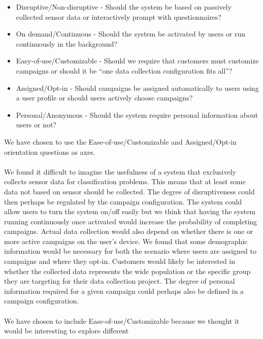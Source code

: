 \begin{itemize}[itemsep=0.1em]
	\item Disruptive/Non-disruptive - Should the system be based on passively collected sensor data or interactively prompt with questionnaires? %
	\item On demand/Continuous - Should the system be activated by users or run continuously in the background? %
	\item Easy-of-use/Customizable - Should we require that customers must customize campaigns or should it be ``one data collection configuration fits all''? %
	\item Assigned/Opt-in - Should campaigns be assigned automatically to users using a user profile or should users actively choose campaigns? %
	\item Personal/Anonymous - Should the system require personal information about users or not? %
\end{itemize}

We have chosen to use the Ease-of-use/Customizable and Assigned/Opt-in orientation questions as axes. 
\\\\
We found it difficult to imagine the usefulness of a system that exclusively collects sensor data for classification problems. This means that at least some data not based on sensor should be collected. The degree of disruptiveness could then perhaps be regulated by the campaign configuration. 
The system could allow users to turn the system on/off easily but we think that having the system running continuously once activated would increase the probability of completing campaigns. Actual data collection would also depend on whether there is one or more active campaigns on the user's device.
We found that some demographic information would be necessary for both the scenario where users are assigned to campaigns and where they opt-in. Customers would likely be interested in whether the collected data represents the wide population or the specific group they are targeting for their data collection project. The degree of personal information required for a given campaign could perhaps also be defined in a campaign configuration. 
\\\\
We have chosen to include Ease-of-use/Customizable because we thought it would be interesting to explore different 






